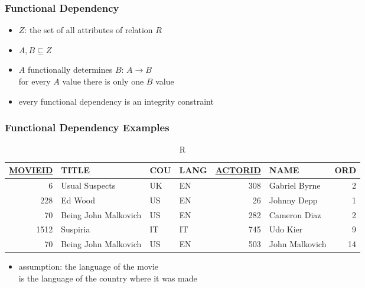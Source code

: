 \documentclass[dvipsnames]{beamer}
\begin{document}
\begin{frame}
  \frametitle{Functional Dependency}

  \begin{definition}
    \begin{itemize}
      \item $Z$: the set of all attributes of relation $R$
      \item $A,B \subseteq Z$

      \pause
      \medskip
      \item \alert{$A$ functionally determines $B$}: $A \rightarrow B$\\
        for every $A$ value there is only one $B$ value
    \end{itemize}
  \end{definition}

  \pause
  \begin{itemize}
    \item every functional dependency is an integrity constraint
  \end{itemize}
\end{frame}

\begin{frame}
  \frametitle{Functional Dependency Examples}

  \begin{example}
    \begin{tiny}
    \begin{table}
      \caption{R}
      \begin{tabular}{|r|l|l|l|r|l|r|}\hline
\underline{MOVIEID} & TITLE    & COU & LANG & \underline{ACTORID} & NAME & ORD\\\hline\hline
      6 & Usual Suspects       & UK  &   EN &     308 & Gabriel Byrne    &   2\\\hline
    228 & Ed Wood              & US  &   EN &      26 & Johnny Depp      &   1\\\hline
     70 & Being John Malkovich & US  &   EN &     282 & Cameron Diaz     &   2\\\hline
   1512 & Suspiria             & IT  &   IT &     745 & Udo Kier         &   9\\\hline
     70 & Being John Malkovich & US  &   EN &     503 & John Malkovich   &  14\\\hline
      \end{tabular}
    \end{table}
    \end{tiny}

    \pause
    \begin{itemize}
      \item assumption: the language of the movie\\
	is the language of the country where it was made
    \end{itemize}
  \end{example}
\end{frame}
\end{document}
